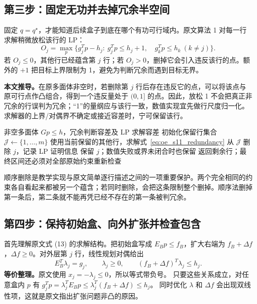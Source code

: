 \documentclass[UTF8,11pt,fontset=fandol,openany,oneside]{ctexbook}
\theoremstyle{definition}
\theoremstyle{remark}
\numberwithin{equation}{chapter}
\begin{document}
\subsection{第三步：固定无功并去掉冗余半空间}

固定 $q=q^\star$，才能知道后续盒子到底在哪个有功可行域内。原文算法 1 对每一行求解稍微放松该行的 LP：
\begin{equation}
 O_j=\max_p\{g_j^Tp-h_j:\ g_j^Tp\le h_j+1,\quad
                 g_k^Tp\le h_k\ (k\ne j)\}.
 \label{eq:oe_s11_redundancy}
\end{equation}
若 $O_j\le0$，其他行已经蕴含第 $j$ 行；若 $O_j>0$，删掉它会引入违反该行的点。额外的 $+1$ 把目标上界限制为 1，避免为判断冗余而遇到目标无界。

\textbf{本文推导。}在原多面体非空时，若删除第 $j$ 行后存在违反它的点，可以将该点与原可行点作凸组合，得到一个违反量处于 $(0,1]$ 的点。因此，放松 1 不会把真正非冗余的行误判为冗余；“1”的量纲应与该行一致，数值实现宜先做行尺度归一化。求解器的上界/对偶界不确定或接近容差时，宁可保留该行。

\begin{algorithm}[tbp]
\caption{S11 去冗余步骤的教学安全实现：顺序删除}
\label{alg:oe_s11_redundancy}
\begin{algorithmic}[1]
\Require 非空多面体 $Gp\le h$，冗余判断容差及 LP 求解容差
\State 初始化保留行集合 $\mathcal J\gets\{1,\ldots,m\}$
 \State 使用当前保留的其他行，求解式~\eqref{eq:oe_s11_redundancy}
   \State 从 $\mathcal J$ 删除 $j$，记录 LP 证明信息
 \Else
   \State 保留 $j$；数值失败或界未闭合时也保留
 \EndIf
\EndFor
\State 返回剩余行；最终区间还必须对全部原始约束重新检查
\end{algorithmic}
\end{algorithm}

顺序删除是教学实现与原文简单逐行描述之间的一项重要保护。两个完全相同的约束各自看起来都被另一个蕴含；若同时删除，会把这条限制整个删掉。顺序法删掉第一条后，第二条就不能再凭已经不存在的第一条被判冗余。

\subsection{第四步：保持初始盒、向外扩张并检查包含}

首先理解原文式 (13) 的求解结构。把初始盒写成
$E_Bp\le f_B$，扩大右端为 $f_B+\Delta f$，$\Delta f\ge0$。对外层第 $j$ 行，线性规划对偶给出
\begin{equation}
 E_B^T\lambda_j=g_j,\qquad\lambda_j\ge0,\qquad
 (f_B+\Delta f)^T\lambda_j\le h_j.
 \label{eq:oe_s11_dual_containment}
\end{equation}
\textbf{等价整理。}原文使用 $x_j=-\lambda_j\le0$，所以等式带负号。
只要这些关系成立，对任意盒内 $p$ 有
$g_j^Tp=\lambda_j^TE_Bp\le\lambda_j^T(f_B+\Delta f)\le h_j$。
同时优化 $\lambda$ 和 $\Delta f$ 会出现双线性项，这就是原文指出扩张问题非凸的原因。
\end{document}
